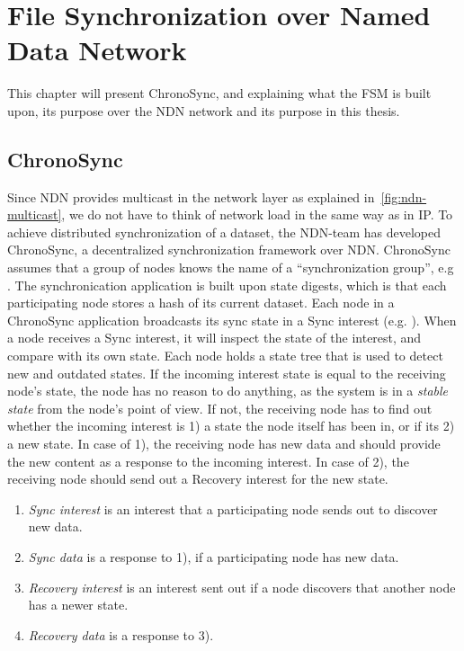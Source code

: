 \chapter{File Synchronization over Named Data Network}\label{chp3:file-sync}
This chapter will present ChronoSync, and explaining what the \gls{FSM} is built upon, its purpose over the \gls{NDN} network and its purpose in this thesis. 

\section{ChronoSync}\label{chronosync}
Since \gls{NDN} provides multicast in the network layer as explained in~\autoref{fig:ndn-multicast}, we do not have to think of network load in the same way as in \gls{IP}.  
To achieve distributed synchronization of a \gls{data}set, the \gls{NDN}-team has developed ChronoSync, a decentralized synchronization framework over \gls{NDN}. 
ChronoSync assumes that a group of nodes knows the \gls{name} of a ``synchronization group'', e.g .
The synchronication application is built upon state digests, which is that each participating node stores a hash of its current \gls{data}set. 
Each node in a ChronoSync application broadcasts its sync state in a Sync \gls{interest} (e.g. ).
When a node receives a Sync \gls{interest}, it will inspect the state of the \gls{interest}, and compare with its own state.
Each node holds a state tree that is used to detect new and outdated states.
If the incoming \gls{interest} state is equal to the receiving node's state, the node has no reason to do anything, as the system is in a \textit{stable state} from the node's point of view.
If not, the receiving node has to find out whether the incoming \gls{interest} is 1) a state the node itself has been in, or if its 2) a new state.
In case of 1), the receiving node has new \gls{data} and should provide the new content as a response to the incoming \gls{interest}. In case of 2), the receiving node should send out a Recovery \gls{interest} for the new state.

\begin{enumerate}
  \item \textit{Sync \gls{interest}} is an \gls{interest} that a participating node sends out to discover new \gls{data}.
  \item \textit{Sync \gls{data}} is a response to 1), if a participating node has new \gls{data}.
  \item \textit{Recovery \gls{interest}} is an \gls{interest} sent out if a node discovers that another node has a newer state.
  \item \textit{Recovery \gls{data}} is a response to 3).
\end{enumerate}

